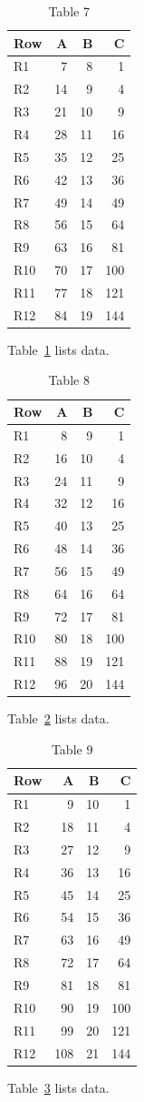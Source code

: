 \documentclass[10pt]{article}
\begin{document}
\begin{table}[ht]\centering\caption{Table 7}\label{tab:7}\begin{tabular}{lrrr}\toprule Row&A&B&C\\\midrule
R1&7&8&1\\
R2&14&9&4\\
R3&21&10&9\\
R4&28&11&16\\
R5&35&12&25\\
R6&42&13&36\\
R7&49&14&49\\
R8&56&15&64\\
R9&63&16&81\\
R10&70&17&100\\
R11&77&18&121\\
R12&84&19&144\\
\bottomrule\end{tabular}\end{table} Table~\ref{tab:7} lists data.
\begin{table}[ht]\centering\caption{Table 8}\label{tab:8}\begin{tabular}{lrrr}\toprule Row&A&B&C\\\midrule
R1&8&9&1\\
R2&16&10&4\\
R3&24&11&9\\
R4&32&12&16\\
R5&40&13&25\\
R6&48&14&36\\
R7&56&15&49\\
R8&64&16&64\\
R9&72&17&81\\
R10&80&18&100\\
R11&88&19&121\\
R12&96&20&144\\
\bottomrule\end{tabular}\end{table} Table~\ref{tab:8} lists data.
\begin{table}[ht]\centering\caption{Table 9}\label{tab:9}\begin{tabular}{lrrr}\toprule Row&A&B&C\\\midrule
R1&9&10&1\\
R2&18&11&4\\
R3&27&12&9\\
R4&36&13&16\\
R5&45&14&25\\
R6&54&15&36\\
R7&63&16&49\\
R8&72&17&64\\
R9&81&18&81\\
R10&90&19&100\\
R11&99&20&121\\
R12&108&21&144\\
\bottomrule\end{tabular}\end{table} Table~\ref{tab:9} lists data.
\end{document}
